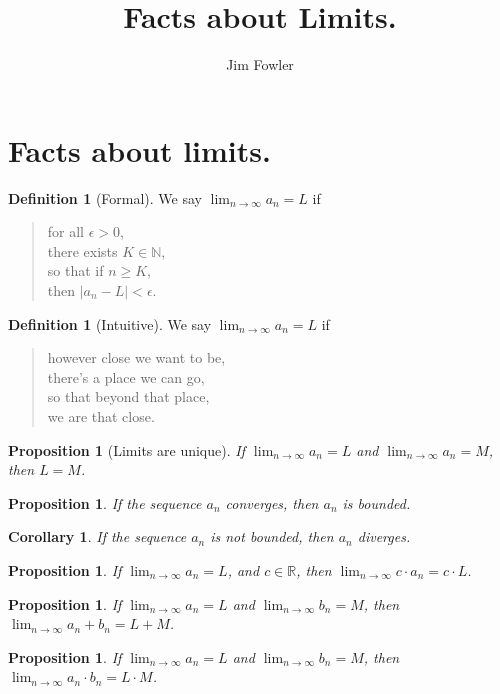 \documentclass[12pt,letterpaper,twocolumn]{article}
\title{Facts about Limits.}
\author{Jim Fowler}
\newtheorem{corollary}[theorem]{Corollary}
\newtheorem{proposition}[theorem]{Proposition}
\theoremstyle{definition}
\newtheorem{definition}[theorem]{Definition}
\newcommand{\R}{\mathbb{R}}
\newcommand{\N}{\mathbb{N}}
\newcommand{\limn}{\displaystyle\lim_{n \to \infty}}
\begin{document}
\section*{Facts about limits.}

\begin{definition}[Formal]
We say $\limn a_n = L$ if
\begin{verse}
  for all $\epsilon > 0$, \\
  there exists $K \in \N$, \\
  so that if $n \geq K$, \\
  then $|a_n - L| < \epsilon$.
\end{verse}
\end{definition}

\begin{definition}[Intuitive]
We say $\limn a_n = L$ if
\begin{verse}
  however close we want to be, \\
  there's a place we can go, \\
  so that beyond that place, \\
  we are that close.
\end{verse}
\end{definition}

\begin{proposition}[Limits are unique]
  If $\limn a_n = L$ and $\limn a_n = M$,
  then $L = M$.
\end{proposition}

\begin{proposition}
  If the sequence $a_n$ converges, then $a_n$ is bounded.
\end{proposition}

\begin{corollary}
  If the sequence $a_n$ is not bounded, then $a_n$ diverges.
\end{corollary}

\begin{proposition}
  If $\limn a_n = L$, and $c \in \R$, then $\lim_{n \to
    \infty} c \cdot a_n = c \cdot L$.
\end{proposition}

\begin{proposition}
  If $\limn a_n = L$ and $\limn b_n = M$,
  then $\limn a_n + b_n = L + M$.
\end{proposition}

\begin{proposition}
  If $\limn a_n = L$ and $\limn b_n = M$,
  then $\limn a_n \cdot b_n = L \cdot M$.
\end{proposition}
\end{document}
